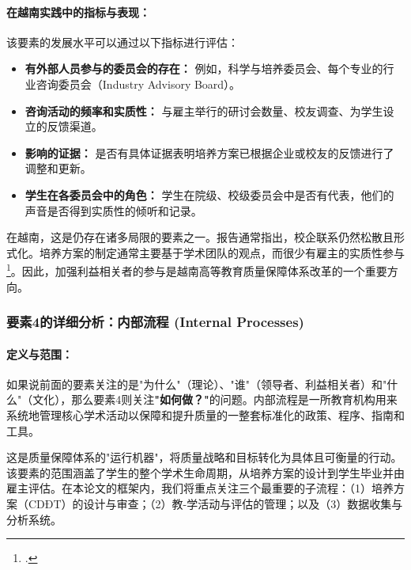 \paragraph{在越南实践中的指标与表现：}
该要素的发展水平可以通过以下指标进行评估：
\begin{itemize}
    \item \textbf{有外部人员参与的委员会的存在：} 例如，科学与培养委员会、每个专业的行业咨询委员会（Industry Advisory Board）。
    \item \textbf{咨询活动的频率和实质性：} 与雇主举行的研讨会数量、校友调查、为学生设立的反馈渠道。
    \item \textbf{影响的证据：} 是否有具体证据表明培养方案已根据企业或校友的反馈进行了调整和更新。
    \item \textbf{学生在各委员会中的角色：} 学生在院级、校级委员会中是否有代表，他们的声音是否得到实质性的倾听和记录。
\end{itemize}
在越南，这是仍存在诸多局限的要素之一。报告通常指出，校企联系仍然松散且形式化。培养方案的制定通常主要基于学术团队的观点，而很少有雇主的实质性参与\footcite{CommonFailureCriteria}。因此，加强利益相关者的参与是越南高等教育质量保障体系改革的一个重要方向。




\subsubsection{要素4的详细分析：内部流程 (Internal Processes)}
\label{subsubsec:thanh_to_4}

\paragraph{定义与范围：}
如果说前面的要素关注的是"为什么"（理论）、"谁"（领导者、利益相关者）和"什么"（文化），那么要素4则关注\textbf{"如何做？"}的问题。内部流程是一所教育机构用来系统地管理核心学术活动以保障和提升质量的一整套标准化的政策、程序、指南和工具。

这是质量保障体系的"运行机器"，将质量战略和目标转化为具体且可衡量的行动。该要素的范围涵盖了学生的整个学术生命周期，从培养方案的设计到学生毕业并由雇主评估。在本论文的框架内，我们将重点关注三个最重要的子流程：（1）培养方案（CDĐT）的设计与审查；（2）教-学活动与评估的管理；以及（3）数据收集与分析系统。

